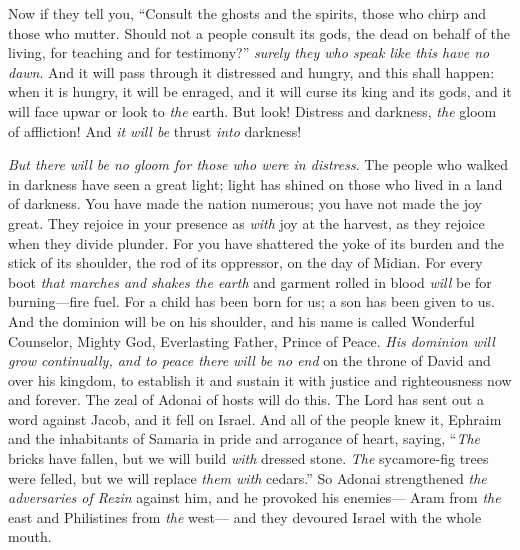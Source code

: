 \begin{biblechapter}
\verse Now if they tell you, “Consult the ghosts and the spirits, those who chirp and those who mutter. Should not a people consult its gods, the dead on behalf of the living,
\verse for teaching and for testimony?” \textit{surely they \textit{who} speak like this have no dawn}.
\verse And it will pass through it distressed and hungry, and this shall happen: when it is hungry, it will be enraged, and it will curse its king and its gods, and it will face upwar
\verse or look to \textit{the} earth. But look! Distress and darkness, \textit{the} gloom of affliction! And \textit{it will be} thrust \textit{into} darkness!
\end{biblechapter}

\begin{biblechapter} %
  \textit{But there will be no gloom for those who were in distress}.
\verse The people who walked in darkness have seen a great light; 
light has shined on those who lived in a land of darkness.
\verse You have made the nation numerous; 
you have not made the joy great. 
They rejoice in your presence as \textit{with} joy at the harvest, 
as they rejoice when they divide plunder.
\verse For you have shattered the yoke of its burden 
and the stick of its shoulder, 
the rod of its oppressor, on the day of Midian.
\verse For every boot \textit{that marches and shakes the earth} 
and garment rolled in blood 
\textit{will} be for burning—fire fuel.
\verse For a child has been born for us; 
a son has been given to us. 
And the dominion will be on his shoulder, 
and his name is called Wonderful Counselor, Mighty God, 
Everlasting Father, Prince of Peace.
\verse \textit{His dominion will grow continually, 
and to peace there will be no end} 
on the throne of David and over his kingdom, 
to establish it and sustain it 
with justice and righteousness 
now and forever. 
The zeal of Adonai of hosts will do this.
 The Lord has sent out a word against Jacob, 
and it fell on Israel.
\verse And all of the people knew it, 
Ephraim and the inhabitants of Samaria 
in pride and arrogance of heart, saying,
\verse “\textit{The} bricks have fallen, but we will build \textit{with} dressed stone. 
\textit{The} sycamore-fig trees were felled, but we will replace \textit{them with} cedars.”
\verse So Adonai strengthened \textit{the adversaries of Rezin} against him, 
and he provoked his enemies—
\verse Aram from \textit{the} east 
and Philistines from \textit{the} west— 
and they devoured Israel with the whole mouth. 

\end{biblechapter}
